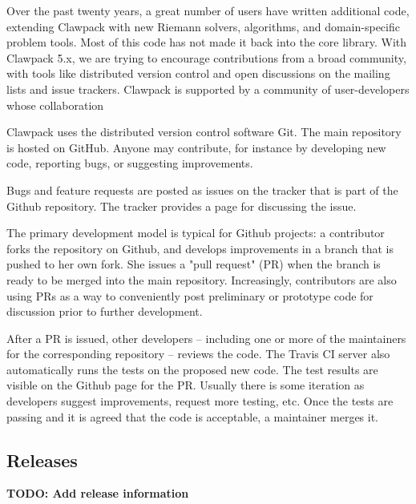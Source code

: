Over the past twenty years, a great number of users have written
additional code, extending Clawpack with new Riemann solvers,
algorithms, and domain-specific problem tools.  Most of this code
has not made it back into the core library.  With Clawpack 5.x,
we are trying to encourage contributions from a broad community, with
tools like distributed version control and open discussions on 
the mailing lists and issue trackers.
Clawpack is supported by a community of user-developers whose
collaboration

Clawpack uses the distributed version control software Git.
The main repository is hosted on GitHub.  Anyone may contribute,
for instance by developing new code, reporting bugs, or suggesting
improvements.

Bugs and feature requests are posted as issues on the tracker that
is part of the Github repository.  The tracker provides a page for
discussing the issue.

The primary development model
is typical for Github projects: a contributor forks the repository on Github,
and develops improvements in a branch that is pushed to her own fork.
She issues a "pull request" (PR) when the branch is ready to be merged
into the main repository.  Increasingly, contributors are also using
PRs as a way to conveniently post preliminary or prototype code for
discussion prior to further development.

After a PR is issued, other developers -- including one or more of the
maintainers for the corresponding repository -- reviews the code.  The Travis
CI server also automatically runs the tests on the proposed new code.  The test
results are visible on the Github page for the PR.  Usually there is some
iteration as developers suggest improvements, request more testing, etc.
Once the tests are passing and it is agreed that the code is acceptable, a
maintainer merges it.

\subsection{Releases}

\textbf{TODO: Add release information}